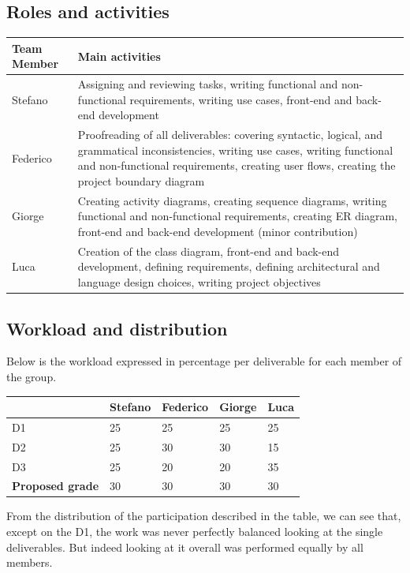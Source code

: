 \documentclass[12pt, a4paper]{article}
\begin{document}
\subsection{Roles and activities}

\begin{table}[H]
\centering
\begin{tabular}{|p{2cm}|p{10cm}|}
\hline
\rowcolor{gray!50}
\textbf{Team Member} & \textbf{Main activities} \\
\hline
Stefano & Assigning and reviewing tasks, writing functional and non-functional requirements, writing use cases, front-end and back-end development \\
\hline
Federico & Proofreading of all deliverables: covering syntactic, logical, and grammatical inconsistencies, writing use cases, writing functional and non-functional requirements, creating user flows, creating the project boundary diagram \\
\hline
Giorge & Creating activity diagrams, creating sequence diagrams, writing functional and non-functional requirements, creating ER diagram, front-end and back-end development (minor contribution) \\
\hline
Luca & Creation of the class diagram, front-end and back-end development, defining requirements, defining architectural and language design choices, writing project objectives \\
\hline
\end{tabular}
\end{table}

\subsection{Workload and distribution}

Below is the workload expressed in percentage per deliverable for each member of the group.

\begin{table}[H]
\centering
\begin{tabular}{|p{3cm}|p{2cm}|p{2cm}|p{2cm}|p{2cm}|}
\hline
\rowcolor{gray!50}
 & \textbf{Stefano} & \textbf{Federico} & \textbf{Giorge} & \textbf{Luca} \\
\hline
D1 & 25 & 25 & 25 & 25 \\
\hline
D2 & 25 & 30 & 30 & 15 \\
\hline
D3 & 25 & 20 & 20 & 35 \\
\hline
\rowcolor{red!20}
\textbf{Proposed grade} & 30 & 30 & 30 & 30 \\
\hline
\end{tabular}
\end{table}

From the distribution of the participation described in the table, we can see that, except on the D1, the work was never perfectly balanced looking at the single deliverables. But indeed looking at it overall was performed equally by all members.
\end{document}
